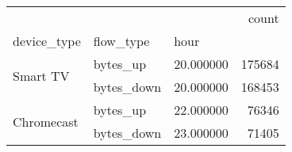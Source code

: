 \begin{tabular}{lllr}
\toprule
 &  &  & count \\
device_type & flow_type & hour &  \\
\midrule
\multirow[t]{2}{*}{Smart TV} & bytes_up & 20.000000 & 175684 \\
\cline{2-4}
 & bytes_down & 20.000000 & 168453 \\
\cline{1-4} \cline{2-4}
\multirow[t]{2}{*}{Chromecast} & bytes_up & 22.000000 & 76346 \\
\cline{2-4}
 & bytes_down & 23.000000 & 71405 \\
\cline{1-4} \cline{2-4}
\bottomrule
\end{tabular}
